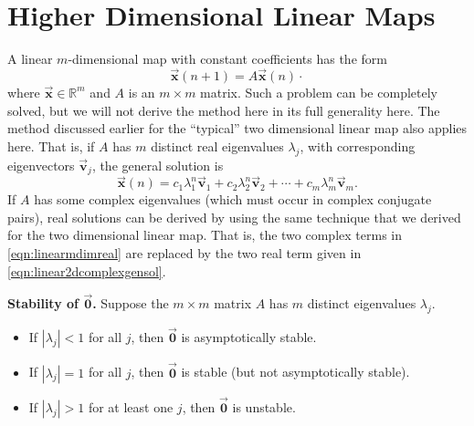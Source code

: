 \documentclass[reqno]{immbook}
\newcommand{\Real}{\mathbb{R}}
\newcommand{\BF}{\vec{\textbf{f}}}
\newcommand{\BV}{\vec{\textbf{v}}}
\newcommand{\BX}{\vec{\textbf{x}}}
\newcommand{\BZero}{\vec{\textbf{0}}}  %
\numberwithin{equation}{chapter}
\numberwithin{question}{section}
\numberwithin{theorem}{chapter}
\numberwithin{figure}{chapter}
\theoremstyle{definition}
\begin{document}
\newpage

\section{Higher Dimensional Linear Maps}
%

A linear $m$-dimensional map with constant coefficients has the form
\begin{equation}
  \BX(n+1) = A\BX(n)
\label{eqn:linearmapmdim}\cdot
\end{equation}
where $\BX\in \Real^m$ and $A$ is an $m\times m$ matrix.
Such a problem can be completely solved, but we will not
derive the method here in its full generality here.
The method discussed earlier for the
``typical'' two dimensional linear map also applies here.
That is, if $A$ has $m$ distinct real eigenvalues
$\lambda_j$, with corresponding eigenvectors
$\BV_j$, the general solution is
\begin{equation}
   \BX(n) = c_1 \lambda_1^n \BV_1 + c_2 \lambda_2^n \BV_2
                 + \cdots + c_m \lambda_m^n\BV_m.
\label{eqn:linearmdimreal}
\end{equation}
%
If $A$ has some complex eigenvalues (which must occur in
complex conjugate pairs), real solutions can be derived
by using the same technique that we derived for the
two dimensional linear map.
That is, the two complex terms in \eqref{eqn:linearmdimreal}
are replaced by the two real term given in
\eqref{eqn:linear2dcomplexgensol}.

\medskip
\noindent
\textbf{Stability of $\BZero$.}
Suppose the $m\times m$ matrix $A$ has $m$ distinct eigenvalues $\lambda_j$.
\begin{itemize}
\item If $|\lambda_j| < 1$ for all $j$, then
$\BZero$ is asymptotically stable.
\item If $|\lambda_j| = 1$ for all $j$, then
$\BZero$ is stable (but not asymptotically stable).
\item If $|\lambda_j| > 1$ for at least one $j$,
then $\BZero$ is unstable.
\end{itemize}
\end{document}
